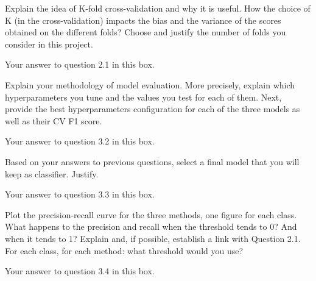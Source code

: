 
\begin{question}{3.1}
Explain the idea of K-fold cross-validation and why it is useful. How the choice of K (in the cross-validation) impacts the bias and the variance of the scores obtained on the different folds? Choose and justify the number of folds you consider in this project. 
\end{question}

\begin{answer}{12} 
    Your answer to question 2.1 in this box.
\end{answer}




\begin{question}{3.2}
Explain your methodology of model evaluation. More precisely, explain which hyperparameters you tune and the values you test for each of them. Next, provide the best hyperparameters configuration for each of the three models as well as their CV F1 score. 
\end{question}

\begin{answer}{13} 
    Your answer to question 3.2 in this box.
\end{answer}




\begin{question}{3.3}
Based on your answers to previous questions, select a final model that you will keep as classifier. Justify. 
\end{question}

\begin{answer}{4} 
    Your answer to question 3.3 in this box.
\end{answer}



\begin{question}{3.4}
Plot the precision-recall curve for the three methods, one figure for each class. What happens to the precision and recall when the threshold tends to 0? And when it tends to 1? Explain and, if possible, establish a link with Question 2.1.
For each class, for each method: what threshold would you use?  
\end{question}

\begin{answer}{18} 
    Your answer to question 3.4 in this box.
\end{answer}
